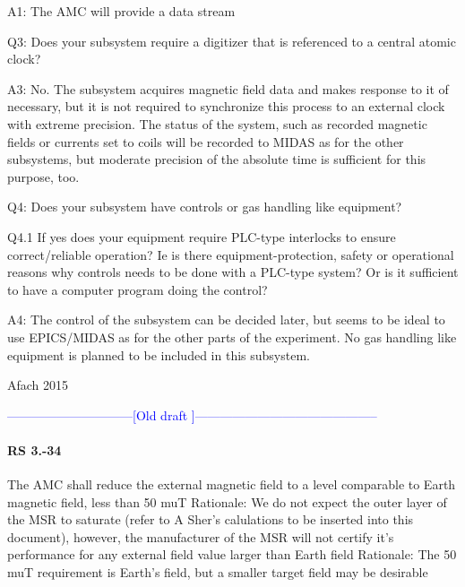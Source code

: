 A1: The AMC will provide a data stream


Q3: Does your subsystem require a digitizer that is referenced to a central atomic clock?

A3: No. The subsystem acquires magnetic field data and makes response to it of necessary, but it is not required to synchronize this process to an external clock with extreme precision. The status of the system, such as recorded magnetic fields or currents set to coils will be recorded to MIDAS as for the other subsystems, but moderate precision of the absolute time is sufficient for this purpose, too.

Q4: Does your subsystem have controls or gas handling like equipment?


Q4.1 If yes does your equipment require PLC-type interlocks to ensure correct/reliable operation?  Ie is there equipment-protection, safety or operational reasons why controls needs to be done with a PLC-type system? Or is it sufficient to have a computer program doing the control?

A4: The control of the subsystem can be decided later, but seems to be ideal to use EPICS/MIDAS as for the other parts of the experiment. No gas handling like equipment is planned to be included in this  subsystem.

\begin{thebibliography}{9}
Afach 2015

\end{thebibliography}


\begin{center}
\textcolor{blue}{
------------------------------[Old draft ]--------------------------------------------
}
\end{center}







\paragraph*{RS 3.-34}	The AMC shall reduce the external magnetic field to a level comparable to Earth magnetic field, less than 50 muT 
\newline Rationale: 	
We do not expect the outer layer of the MSR to saturate (refer to A Sher's calulations to be inserted into this document), however, the manufacturer of the MSR will not certify it's performance for any external field value larger than Earth field
\newline Rationale: 	The 50 muT requirement is Earth’s field, but a smaller target field may be desirable

